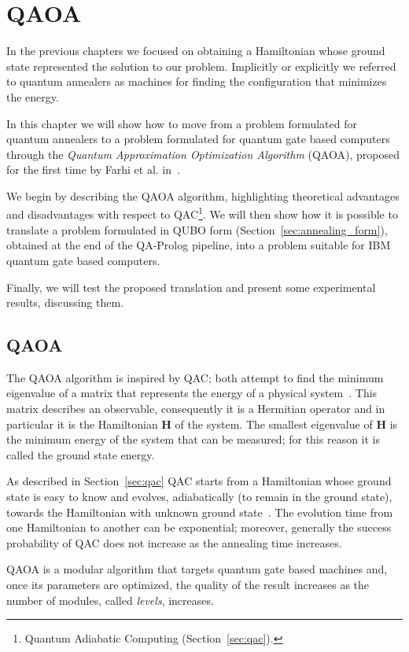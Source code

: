 \chapter{QAOA}
\label{ch:qaoa}
In the previous chapters we focused on obtaining a Hamiltonian whose ground state represented the solution to our problem. Implicitly or explicitly we referred to quantum annealers as machines for finding the configuration that minimizes the energy.

In this chapter we will show how to move from a problem formulated for quantum annealers to a problem formulated for quantum gate based computers through the \emph{Quantum Approximation Optimization Algorithm} (QAOA), proposed for the first time by Farhi et al. in~\cite{farhi2014quantum}.

We begin by describing the QAOA algorithm, highlighting theoretical advantages and disadvantages with respect to QAC\footnote{Quantum Adiabatic Computing (Section~\ref{sec:qac}).}. We will then show how it is possible to translate a problem formulated in QUBO form (Section~\ref{sec:annealing_form}), obtained at the end of the QA-Prolog pipeline, into a problem suitable for IBM quantum gate based computers.

Finally, we will test the proposed translation and present some experimental results, discussing them.
\section{QAOA}
The QAOA algorithm is inspired by QAC; both attempt to find the minimum eigenvalue of a matrix that represents the energy of a physical system~\cite{fakhimi2023quantum}. This matrix describes an observable, consequently it is a Hermitian operator and in particular it is the Hamiltonian $\mathbf{H}$ of the system. The smallest eigenvalue of $\mathbf{H}$ is the minimum energy of the system that can be measured; for this reason it is called the ground state energy.

As described in Section~\ref{sec:qac} QAC starts from a Hamiltonian whose ground state is easy to know and evolves, adiabatically (to remain in the ground state), towards the Hamiltonian with unknown ground state~\cite{fakhimi2023quantum}. The evolution time from one Hamiltonian to another can be exponential\cite{farhi2014quantum}; moreover, generally the success probability of QAC does not increase as the annealing time increases.

QAOA is a modular algorithm that targets quantum gate based machines and, once its parameters are optimized, the quality of the result increases as the number of modules, called \emph{levels}, increases.

